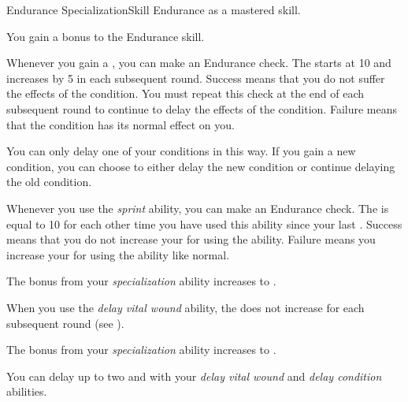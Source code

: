     \begin{feat}{Endurance Specialization}{Skill}
        \featpre Endurance as a mastered skill.

         You gain a  bonus to the Endurance skill.

         Whenever you gain a , you can make an Endurance check.
        The  starts at 10 and increases by 5 in each subsequent round.
        Success means that you do not suffer the effects of the condition.
        You must repeat this check at the end of each subsequent round to continue to delay the effects of the condition.
        Failure means that the condition has its normal effect on you.

        You can only delay one of your conditions in this way.
        If you gain a new condition, you can choose to either delay the new condition or continue delaying the old condition.

         Whenever you use the \textit{sprint} ability, you can make an Endurance check.
        The  is equal to 10  for each other time you have used this ability since your last .
        Success means that you do not increase your  for using the ability.
        Failure means you increase your  for using the ability like normal.

         The bonus from your \textit{specialization} ability increases to .

        When you use the \textit{delay vital wound} ability, the  does not increase for each subsequent round (see ).

         The bonus from your \textit{specialization} ability increases to .

         You can delay up to two  and  with your \textit{delay vital wound} and \textit{delay condition} abilities.
    \end{feat}

